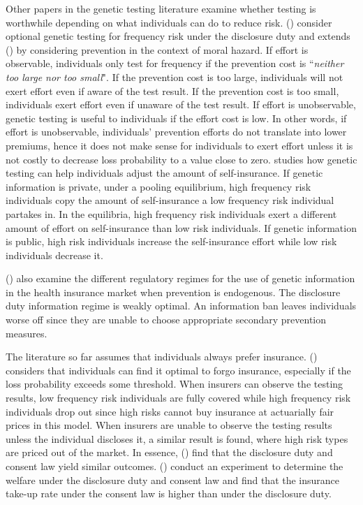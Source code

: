 \documentclass[nonatbib,preprint,12pt]{elsarticle}
\theoremstyle{plain}
\theoremstyle{definition}
\theoremstyle{plain}
\theoremstyle{TheoremNum}
\theoremstyle{CorollaryNum}
\theoremstyle{PropositionNum}
\theoremstyle{TheoremNum}
\begin{document}
Other papers in the genetic testing literature examine whether testing is worthwhile depending on what individuals can do to reduce risk. \citeauthor{bardey2013genetic} (\citeyear{bardey2013genetic}) consider optional genetic testing for frequency risk under the disclosure duty and extends \citeauthor{barigozzi2011genetic} (\citeyear{barigozzi2011genetic}) by considering prevention in the context of moral hazard. If effort is observable, individuals only test for frequency if the prevention cost is ``\textit{neither too large nor too small}". If the prevention cost is too large, individuals will not exert effort even if aware of the test result. If the prevention cost is too small, individuals exert effort even if unaware of the test result. If effort is unobservable, genetic testing is useful to individuals if the effort cost is low. In other words, if effort is unobservable, individuals' prevention efforts do not translate into lower premiums, hence it does not make sense for individuals to exert effort unless it is not costly to decrease loss probability to a value close to zero. \textcite{crainich2017self} studies how genetic testing can help individuals adjust the amount of self-insurance. If genetic information is private, under a pooling equilibrium, high frequency risk individuals copy the amount of self-insurance a low frequency risk individual partakes in. In the \textcite{rothschild1978equilibrium, miyazaki1977rat, spence1978product} equilibria, high frequency risk individuals exert a different amount of effort on self-insurance than low risk individuals. If genetic information is public, high risk individuals increase the self-insurance effort while low risk individuals decrease it.

\citeauthor*{peter2017endogenous} (\citeyear{peter2017endogenous}) also examine the different regulatory regimes for the use of genetic information in the health insurance market when prevention is endogenous. The disclosure duty information regime is weakly optimal. An information ban leaves individuals worse off since they are unable to choose appropriate secondary prevention measures. 

The literature so far assumes that individuals always prefer insurance. \citeauthor{posey2021genetic} (\citeyear{posey2021genetic}) considers that individuals can find it optimal to forgo insurance, especially if the loss probability exceeds some threshold. When insurers can observe the testing results, low frequency risk individuals are fully covered while high frequency risk individuals drop out since high risks cannot buy insurance at actuarially fair prices in this model. When insurers are unable to observe the testing results unless the individual discloses it, a similar result is found, where high risk types are priced out of the market. In essence, \citeauthor{posey2021genetic} (\citeyear{posey2021genetic}) find that the disclosure duty and consent law yield similar outcomes. \citeauthor*{bardey2019trade} (\citeyear{bardey2019trade}) conduct an experiment to determine the welfare under the disclosure duty and consent law and find that the insurance take-up rate under the consent law is higher than under the disclosure duty.
\end{document}
